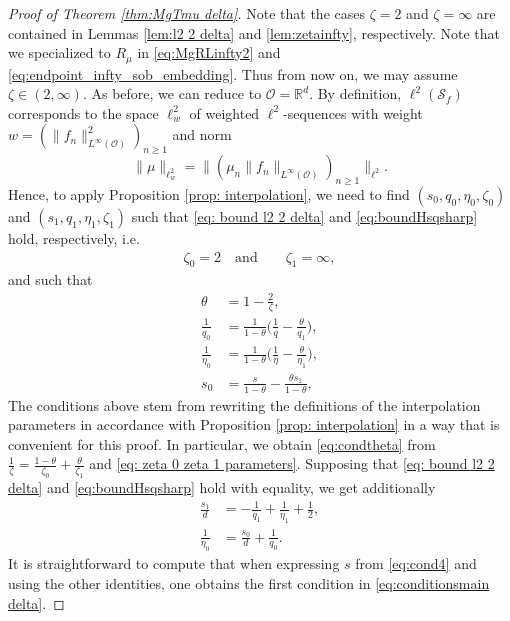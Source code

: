 \documentclass[reqno]{amsart}
\theoremstyle{plain}
\theoremstyle{remark}
\theoremstyle{plain}
\numberwithin{equation}{section}
\def\R{{\mathbb R}}
\newcommand{\Domm}{\mathcal{O}}
\newcommand{\1}{\one}
\newcommand{\Sf}{\mathcal{S}_{f}}
\begin{document}
\begin{proof}[Proof of Theorem \ref{thm:MgTmu delta}]
Note that the cases $\zeta = 2$ and $\zeta=\infty$ are contained in Lemmas \ref{lem:l2 2 delta} and \ref{lem:zetainfty}, respectively. Note that we specialized to $R_{\mu}$ in  \eqref{eq:MgRLinfty2} and \eqref{eq:endpoint_infty_sob_embedding}. Thus from now on, we may assume $\zeta\in (2, \infty)$. 
As before, we can reduce to $\mathcal{O} = \R^d$. 
By definition, $\ell^2(\Sf)$ corresponds to the space $\ell^2_w$ of weighted $\ell^2$-sequences with weight $w=(\|f_n\|_{L^\infty(\Domm)}^2)_{n\geq 1}$ and norm 
$$
\|\mu\|_{\ell^2_w}=\|(\mu_n\|f_n\|_{L^\infty(\Domm)})_{n\geq 1}\|_{\ell^2}.
$$
Hence, to apply Proposition \ref{prop: interpolation}, we need to find  $(s_0, q_0, \eta_0, \zeta_0)$ and $(s_1, q_1, \eta_1, \zeta_1)$ such that \eqref{eq: bound l2 2 delta} and \eqref{eq:boundHsqsharp} hold, respectively, i.e.
\begin{align}
\label{eq: zeta 0 zeta 1 parameters}
    \zeta_0=2\quad\text{and}\quad
    \quad\zeta_1 = \infty,
\end{align}
and such that
\begin{align}
\label{eq:condtheta}
\theta &= 1-\frac{2}{\zeta},
\\
    \label{eq:cond1} \frac{1}{q_0} &= \frac{1}{1-\theta} \Big(\frac{1}{q} - \frac{\theta}{q_1}\Big),
\\
\label{eq:cond2} \frac{1}{\eta_0} &= \frac{1}{1-\theta} \Big(\frac{1}{\eta} - \frac{\theta}{\eta_1}\Big),
\\
\label{eq:cond4} s_0 &= \frac{s}{1-\theta}-\frac{\theta s_1}{1-\theta},
\end{align}
The conditions above stem from rewriting the definitions of the interpolation parameters in accordance with Proposition \ref{prop: interpolation} in a way that is convenient for this proof. In particular, we obtain \eqref{eq:condtheta} from $\frac{1}{\zeta} = \frac{1-\theta}{\zeta_0} + \frac{\theta}{\zeta_1}$ and \eqref{eq: zeta 0 zeta 1 parameters}.
Supposing that \eqref{eq: bound l2 2 delta} and \eqref{eq:boundHsqsharp}  hold with equality, we get additionally
\begin{align}
\label{eq:cond3} \frac{s_1}{d} &= - \frac{1}{q_1}  + \frac{1}{\eta_1}+\frac12,
\\
\label{eq:cond5} \frac{1}{\eta_0} &= \frac{s_0}{d} + \frac{1}{q_0}.
\end{align}
It is straightforward to compute that when expressing $s$ from \eqref{eq:cond4} and using the other identities, one obtains the first condition in \eqref{eq:conditionsmain delta}.

\end{proof}
\end{document}
